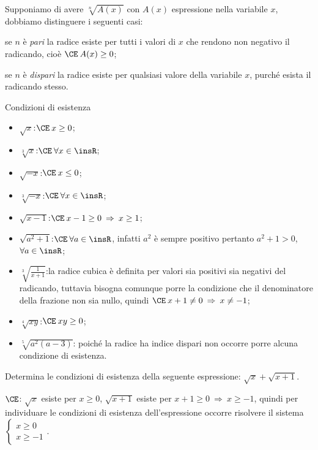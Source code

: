 Supponiamo di avere $\sqrt[n]{A(x)}$ con $A(x)$ espressione nella variabile $x$, dobbiamo distinguere i seguenti casi:
\begin{itemize*}
\item se $n$ è \emph{pari} la radice esiste per tutti i valori di $x$ che rendono non negativo il radicando, cioè $\CE\: A(x)\ge 0$;
\item se $n$ è \emph{dispari} la radice esiste per qualsiasi valore della variabile $x$, purché esista il radicando stesso.
\end{itemize*}

\begin{exrig}
\begin{esempio}
Condizioni di esistenza
 \begin{itemize}
 \item $\sqrt{x}$:\quad $\CE\: x\ge 0$;
 \item $\sqrt[3]{x}$:\quad $\CE\: \forall x\in \insR$;
 \item $\sqrt{-x}$:\quad $\CE\: x\le 0$;
 \item $\sqrt[3]{-x}$:\quad $\CE\: \forall x\in \insR$;
 \item $\sqrt{x-1}$:\quad $\CE\: x-1\ge 0 \:\Rightarrow\: x\ge 1$;
 \item $\sqrt{a^2+1}$:\quad $\CE\: \forall a\in \insR$, infatti $a^2$ è sempre positivo pertanto $a^2+1>0$, $\forall a\in \insR$;
 \item $\sqrt[3]{\frac{1}{x+1}}$:\quad la radice cubica è definita per valori sia positivi sia negativi del radicando, tuttavia bisogna comunque porre la condizione che il denominatore della frazione non sia nullo, quindi $\CE\: x+1\neq 0 \:\Rightarrow\: x\neq -1$;
 \item $\sqrt[4]{xy}$:\quad $\CE\: xy\ge 0$;
 \item $\sqrt[5]{a^2(a-3)}$: poiché la radice ha indice dispari non occorre porre alcuna condizione di esistenza.
\end{itemize}
\end{esempio}

\begin{esempio}
 Determina le condizioni di esistenza della seguente espressione: $\sqrt{x}+\sqrt{x+1}$.

$\CE$: $\sqrt{x}$ esiste per $x\ge 0$, $\sqrt{x+1}$ esiste per $x+1\ge 0\:\Rightarrow\: x\ge -1$, quindi per individuare le condizioni di esistenza dell'espressione occorre risolvere il sistema $\left\{\begin{array}{l} x\ge0\\ x\ge-1\end{array}\right.$.
\begin{center}
 
\end{center}


\end{esempio}
\end{exrig}
